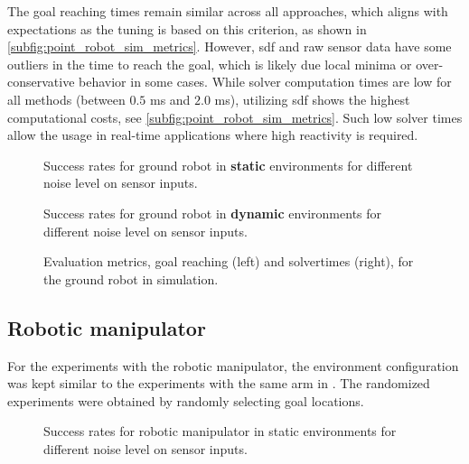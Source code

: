 The goal reaching times remain similar across all approaches, which aligns with
expectations as the tuning is based on this criterion, as shown in
\cref{subfig:point_robot_sim_metrics}. However, \ac{sdf} and
raw sensor data have some outliers in the time to reach the
goal, which is likely due local minima or
over-conservative behavior in some cases.
While solver computation times are low
for all methods (between $0.5$ ms and $2.0$ ms), utilizing
\ac{sdf} shows the highest computational costs, see
\cref{subfig:point_robot_sim_metrics}. Such low solver
times allow the usage in real-time applications where high
reactivity is required.
%
\begin{figure*}[ht]
  \centering
  
  \caption{Success rates for ground robot in \textbf{static}
  environments for different noise level on sensor inputs.
  }%
  \label{fig:point_robot_sim_success_static}
\end{figure*}
%
\begin{figure*}[ht]
  \centering
  
  \caption{Success rates for ground robot in
  \textbf{dynamic}
  environments for different noise level on sensor inputs.
  }%
  \label{fig:point_robot_sim_success_dynamic}
\end{figure*}
%
\begin{figure}[ht]
  \centering
  \begin{subfigure}{0.48\linewidth}
    \centering
    
    \label{subfig:point_robot_sim_time2Goal}
  \end{subfigure}
  \begin{subfigure}{0.48\linewidth}
    \centering
    
    \label{subfig:point_robot_sim_solvertimes}
  \end{subfigure}%
  \caption{Evaluation metrics, goal reaching (left) and
  solvertimes (right), for the ground robot in simulation.
  }%
  \label{fig:point_robot_sim_metrics}
\end{figure}

\newpage

\subsection{Robotic manipulator}
\label{sub:manipulator}
%
For the experiments with the robotic manipulator, the
environment configuration was kept similar to the
experiments with the same arm in \cite{bhardwaj2022storm}.
The randomized experiments were obtained by randomly
selecting goal locations.
%
\begin{figure*}[ht]
  \centering
  
  \caption{Success rates for robotic manipulator in static
  environments for different noise level on sensor inputs.
  }%
  \label{fig:panda_robot_sim_success_static}
\end{figure*}
%

